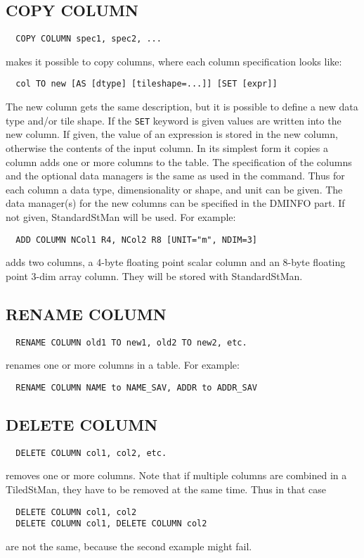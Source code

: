 \subsection{COPY COLUMN}
\begin{verbatim}
  COPY COLUMN spec1, spec2, ...
\end{verbatim}
makes it possible to copy columns, where each column specification
looks like:
\begin{verbatim}
  col TO new [AS [dtype] [tileshape=...]] [SET [expr]]
\end{verbatim}
The new column gets the same description, but it is possible to define
a new data type and/or tile shape. If the \texttt{SET} keyword is
given values are written into the new column. If given, the value of an expression is
stored in the new column, otherwise the contents of the input column.
In its simplest form it copies a column
adds one or more columns to the table.
The specification of the columns and the optional data managers is the
same as used in the
 command. Thus for each column
a data type, dimensionality or shape, and unit  can be given.
The data manager(s) for the new columns can be specified in the DMINFO
part. If not given, StandardStMan will be used.
For example:
\begin{verbatim}
  ADD COLUMN NCol1 R4, NCol2 R8 [UNIT="m", NDIM=3]
\end{verbatim}
adds two columns, a 4-byte floating point scalar column and an 8-byte
floating point 3-dim array column. They will be stored with StandardStMan.

\subsection{RENAME COLUMN}
\begin{verbatim}
  RENAME COLUMN old1 TO new1, old2 TO new2, etc.
\end{verbatim}
renames one or more columns in a table.
For example:
\begin{verbatim}
  RENAME COLUMN NAME to NAME_SAV, ADDR to ADDR_SAV
\end{verbatim}

\subsection{DELETE COLUMN}
\begin{verbatim}
  DELETE COLUMN col1, col2, etc.
\end{verbatim}
removes one or more columns.
Note that if multiple columns are combined in a TiledStMan, they have
to be removed at the same time. Thus in that case
\begin{verbatim}
  DELETE COLUMN col1, col2
  DELETE COLUMN col1, DELETE COLUMN col2
\end{verbatim}
are not the same, because the second example might fail.

